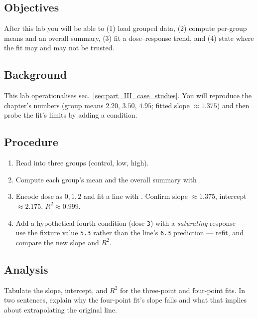 \documentclass[
]{article}
\providecommand{\tightlist}{%
  \setlength{\itemsep}{0pt}\setlength{\parskip}{0pt}}
\theoremstyle{plain}
\theoremstyle{definition}
\begin{document}
\subsection{Objectives}\label{objectives-10}

After this lab you will be able to (1) load grouped data, (2) compute
per-group means and an overall summary, (3) fit a dose--response trend,
and (4) state where the fit may and may not be trusted.

\subsection{Background}\label{background-10}

This lab operationalises sec.~\ref{sec:part_III_case_studies}. You will
reproduce the chapter's numbers (group means \(2.20\), \(3.50\),
\(4.95\); fitted slope \(\approx
1.375\)) and then probe the fit's limits by adding a condition.

\subsection{Procedure}\label{procedure-10}

\begin{enumerate}
\def\labelenumi{\arabic{enumi}.}
\tightlist
\item
  Read  into three groups
  (control, low, high).
\item
  Compute each group's mean and the overall summary with
  .
\item
  Encode dose as \(0, 1, 2\) and fit a line with
  . Confirm slope \(\approx 1.375\),
  intercept \(\approx 2.175\), \(R^2 \approx 0.999\).
\item
  Add a hypothetical fourth condition (dose \texttt{3}) with a
  \emph{saturating} response --- use the fixture value \texttt{5.3}
  rather than the line's \texttt{6.3} prediction --- refit, and compare
  the new slope and \(R^2\).
\end{enumerate}

\subsection{Analysis}\label{analysis-10}

Tabulate the slope, intercept, and \(R^2\) for the three-point and
four-point fits. In two sentences, explain why the four-point fit's
slope falls and what that implies about extrapolating the original line.
\end{document}
